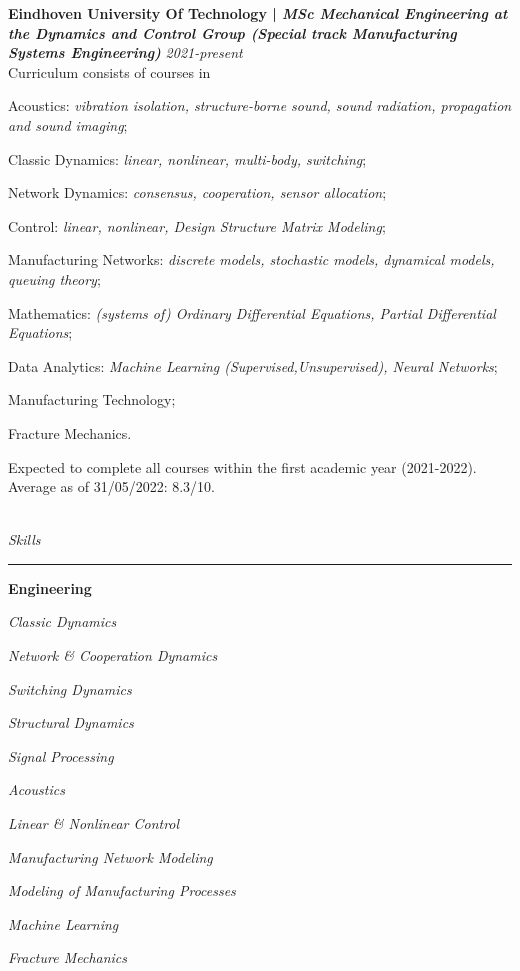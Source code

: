 \documentclass[12pt]{article}
\begin{document}
\textbf{Eindhoven University Of Technology | \textit{MSc Mechanical Engineering at the Dynamics and Control Group (Special track Manufacturing Systems Engineering)}} \hfill \textit{2021-present}\\
Curriculum consists of courses in
\begin{compactitem}
    \item Acoustics: \textit{vibration isolation, structure-borne sound, sound radiation, propagation and sound imaging};
    \item Classic Dynamics: \textit{linear, nonlinear, multi-body, switching};
    \item Network Dynamics: \textit{consensus, cooperation, sensor allocation};
    \item Control: \textit{linear, nonlinear, Design Structure Matrix Modeling};
    \item Manufacturing Networks: \textit{discrete models, stochastic models, dynamical models, queuing theory};
    \item Mathematics: \textit{(systems of) Ordinary Differential Equations, Partial Differential Equations};
    \item Data Analytics: \textit{Machine Learning (Supervised,Unsupervised), Neural Networks};
    \item Manufacturing Technology;
    \item Fracture Mechanics.

\end{compactitem}
Expected to complete all courses within the first academic year (2021-2022). Average as of 31/05/2022: 8.3/10.


\hfill\\

\textit{\huge{Skills}} \\
\noindent\hfil\rule{\textwidth}{.4pt}\hfill

\textbf{Engineering}\\
\begin{multicols}{2}
\begin{compactitem}
    \item \textit{Classic Dynamics}
    \item \textit{Network \& Cooperation Dynamics}
    \item \textit{Switching Dynamics}
    \item \textit{Structural Dynamics}
    \item \textit{Signal Processing}
    \item \textit{Acoustics}
    \item \textit{Linear \& Nonlinear Control}
    \item \textit{Manufacturing Network Modeling}
    \item \textit{Modeling of Manufacturing Processes}
    \item \textit{Machine Learning}
    \item \textit{Fracture Mechanics}
\end{compactitem}
\end{multicols}
\end{document}
